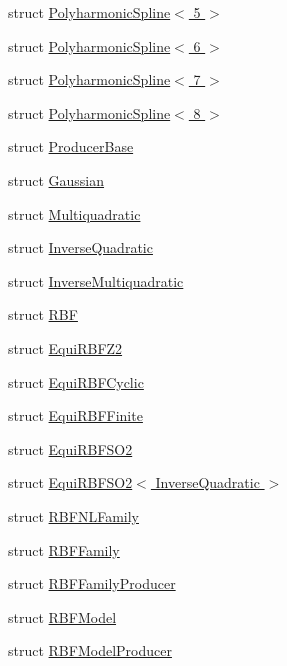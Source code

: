 \begin{DoxyCompactItemize}
\item 
struct \hyperlink{struct_d_r_d_s_p_1_1_polyharmonic_spline_3_015_01_4}{Polyharmonic\-Spline$<$ 5 $>$}
\item 
struct \hyperlink{struct_d_r_d_s_p_1_1_polyharmonic_spline_3_016_01_4}{Polyharmonic\-Spline$<$ 6 $>$}
\item 
struct \hyperlink{struct_d_r_d_s_p_1_1_polyharmonic_spline_3_017_01_4}{Polyharmonic\-Spline$<$ 7 $>$}
\item 
struct \hyperlink{struct_d_r_d_s_p_1_1_polyharmonic_spline_3_018_01_4}{Polyharmonic\-Spline$<$ 8 $>$}
\item 
struct \hyperlink{struct_d_r_d_s_p_1_1_producer_base}{Producer\-Base}
\item 
struct \hyperlink{struct_d_r_d_s_p_1_1_gaussian}{Gaussian}
\item 
struct \hyperlink{struct_d_r_d_s_p_1_1_multiquadratic}{Multiquadratic}
\item 
struct \hyperlink{struct_d_r_d_s_p_1_1_inverse_quadratic}{Inverse\-Quadratic}
\item 
struct \hyperlink{struct_d_r_d_s_p_1_1_inverse_multiquadratic}{Inverse\-Multiquadratic}
\item 
struct \hyperlink{struct_d_r_d_s_p_1_1_r_b_f}{R\-B\-F}
\item 
struct \hyperlink{struct_d_r_d_s_p_1_1_equi_r_b_f_z2}{Equi\-R\-B\-F\-Z2}
\item 
struct \hyperlink{struct_d_r_d_s_p_1_1_equi_r_b_f_cyclic}{Equi\-R\-B\-F\-Cyclic}
\item 
struct \hyperlink{struct_d_r_d_s_p_1_1_equi_r_b_f_finite}{Equi\-R\-B\-F\-Finite}
\item 
struct \hyperlink{struct_d_r_d_s_p_1_1_equi_r_b_f_s_o2}{Equi\-R\-B\-F\-S\-O2}
\item 
struct \hyperlink{struct_d_r_d_s_p_1_1_equi_r_b_f_s_o2_3_01_inverse_quadratic_01_4}{Equi\-R\-B\-F\-S\-O2$<$ Inverse\-Quadratic $>$}
\item 
struct \hyperlink{struct_d_r_d_s_p_1_1_r_b_f_n_l_family}{R\-B\-F\-N\-L\-Family}
\item 
struct \hyperlink{struct_d_r_d_s_p_1_1_r_b_f_family}{R\-B\-F\-Family}
\item 
struct \hyperlink{struct_d_r_d_s_p_1_1_r_b_f_family_producer}{R\-B\-F\-Family\-Producer}
\item 
struct \hyperlink{struct_d_r_d_s_p_1_1_r_b_f_model}{R\-B\-F\-Model}
\item 
struct \hyperlink{struct_d_r_d_s_p_1_1_r_b_f_model_producer}{R\-B\-F\-Model\-Producer}

\end{DoxyCompactItemize}
